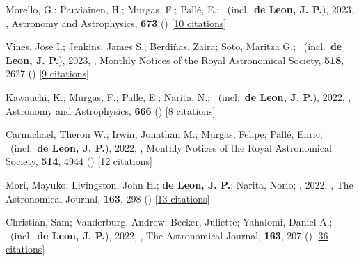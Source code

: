 \item[{\color{numcolor}\scriptsize50}] Morello, G.; Parviainen, H.; Murgas, F.; Pall{\'e}, E.; \etal\ (incl.\ \textbf{de Leon, J. P.}), 2023, , Astronomy and Astrophysics, \textbf{673} () [\href{https://ui.adsabs.harvard.edu/abs/2023A&A...673A..32M}{10 citations}]

\item[{\color{numcolor}\scriptsize49}] Vines, Jose I.; Jenkins, James S.; Berdi{\~n}as, Zaira; Soto, Maritza G.; \etal\ (incl.\ \textbf{de Leon, J. P.}), 2023, , Monthly Notices of the Royal Astronomical Society, \textbf{518}, 2627 () [\href{https://ui.adsabs.harvard.edu/abs/2023MNRAS.518.2627V}{9 citations}]

\item[{\color{numcolor}\scriptsize48}] Kawauchi, K.; Murgas, F.; Palle, E.; Narita, N.; \etal\ (incl.\ \textbf{de Leon, J. P.}), 2022, , Astronomy and Astrophysics, \textbf{666} () [\href{https://ui.adsabs.harvard.edu/abs/2022A&A...666A...4K}{8 citations}]

\item[{\color{numcolor}\scriptsize47}] Carmichael, Theron W.; Irwin, Jonathan M.; Murgas, Felipe; Pall{\'e}, Enric; \etal\ (incl.\ \textbf{de Leon, J. P.}), 2022, , Monthly Notices of the Royal Astronomical Society, \textbf{514}, 4944 () [\href{https://ui.adsabs.harvard.edu/abs/2022MNRAS.514.4944C}{12 citations}]

\item[{\color{numcolor}\scriptsize46}] Mori, Mayuko; Livingston, John H.; \textbf{de Leon, J. P.}; Narita, Norio; \etal, 2022, , The Astronomical Journal, \textbf{163}, 298 () [\href{https://ui.adsabs.harvard.edu/abs/2022AJ....163..298M}{13 citations}]

\item[{\color{numcolor}\scriptsize45}] Christian, Sam; Vanderburg, Andrew; Becker, Juliette; Yahalomi, Daniel A.; \etal\ (incl.\ \textbf{de Leon, J. P.}), 2022, , The Astronomical Journal, \textbf{163}, 207 () [\href{https://ui.adsabs.harvard.edu/abs/2022AJ....163..207C}{36 citations}]

